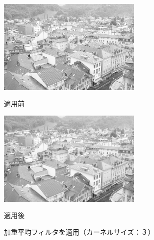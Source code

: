 \documentclass{jsarticle}
\begin{document}
\begin{figure}[htbp]
 \begin{minipage}{0.5\hsize}
  \begin{center}
   \includegraphics[width=70mm]{town.png}
  \end{center}
  \caption{適用前}
  \label{fig:one}
 \end{minipage}
 \begin{minipage}{0.5\hsize}
  \begin{center}
   \includegraphics[width=70mm]{output_ave_3.png}
  \end{center}
  \caption{適用後}
  \label{fig:two}
 \end{minipage}
 \caption{加重平均フィルタを適用（カーネルサイズ：３）}
\end{figure}
\end{document}
